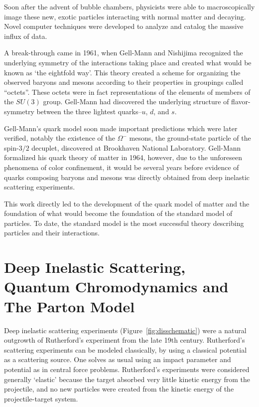 Soon after the advent of bubble chambers, physicists were able to
macroscopically image these new, exotic particles interacting with normal matter
and decaying. Novel computer techniques were developed to analyze and catalog
the massive influx of data.

A break-through came in 1961, when Gell-Mann and Nishijima recognized the
underlying symmetry of the interactions taking place and created what would be
known as `the eightfold way'. This theory created a scheme for organizing the
observed baryons and mesons according to their properties in groupings called
``octets''. These octets were in fact representations of the elements of members
of the $SU(3)$ group. Gell-Mann had discovered the underlying structure of
flavor-symmetry between the three lightest quarks--$u$, $d$, and $s$. 

Gell-Mann's quark model soon made important predictions which were later
verified, notably the existence of the $\Omega^{-}$ mesons, the ground-state
particle of the spin-$3/2$ decuplet, discovered at Brookhaven National
Laboratory. Gell-Mann formalized his quark theory of matter in 1964, however,
due to the unforeseen phenomena of color confinement, it would be several years
before evidence of quarks composing baryons and mesons was directly obtained
from deep inelastic scattering experiments.

This work directly led to the development of the quark model of matter and the
foundation of what would become the foundation of the standard model of
particles. To date, the standard model is the most successful theory describing
particles and their interactions.


\clearpage
\section{Deep Inelastic Scattering, Quantum Chromodynamics and The Parton Model}

Deep inelastic scattering experiments (Figure~\ref{fig:disschematic}) were a
natural outgrowth of Rutherford's experiment from the late 19th century.
Rutherford's scattering experiments can be modeled classically, by using a
classical potential as a scattering source. One solves as usual using an
impact parameter and potential as in central force problems.  Rutherford's
experiments were considered generally `elastic' because the target absorbed very
little kinetic energy from the projectile, and no new particles were created
from the kinetic energy of the projectile-target system.

